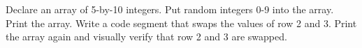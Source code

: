 \begin{ex}
Declare an array of 5-by-10 integers. Put random integers 0-9 into the array. Print the array. Write a code segment that swaps the values of row 2 and 3. Print the array again and visually verify that row 2 and 3 are swapped.
\end{ex}
